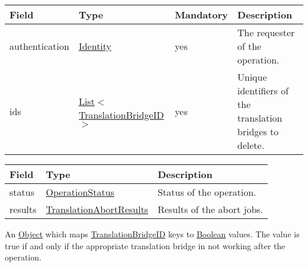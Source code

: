 \documentclass[a4paper]{arrowhead}
\newcommand{\pref}[1]{{\textcolor{ArrowheadGrey}{\hyperref[sec:model:primitives:#1]{#1}}}}
\begin{document}
\begin{table}[ht!]
\begin{tabularx}{\textwidth}{| p{3.9cm} | p{5.0cm} | p{2cm} | X |} \hline
\rowcolor{gray!33} Field & Type & Mandatory & Description \\ \hline
authentication & \hyperref[sec:model:Identity]{Identity} & yes & The requester of the operation. \\ \hline
ids & \pref{List}$<$\pref{TranslationBridgeID}$>$ & yes & Unique identifiers of the translation bridges to delete. \\ \hline
\end{tabularx}
\end{table}


\begin{table}[ht!]
\begin{tabularx}{\textwidth}{| p{4.25cm} | p{5.5cm} | X |} \hline
\rowcolor{gray!33} Field & Type      & Description \\ \hline
status & \pref{OperationStatus} & Status of the operation. \\ \hline
results & \hyperref[sec:model:TranslationAbortResults]{TranslationAbortResults} & Results of the abort jobs. \\ \hline
\end{tabularx}
\end{table}


An \pref{Object} which maps \pref{TranslationBridgeID} keys to \pref{Boolean} values. The value is true if and only if the appropriate translation bridge in not working after the operation.

\end{document}
